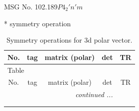 \documentclass[fleqn,8pt]{jsarticle}
\begin{document}
\setcounter{MaxMatrixCols}{32}

\renewcommand{\tablename}{Table~}
\renewcommand{\figurename}{Figure~}
\begin{center}
\LARGE
MSG No. 102.189\quad$P4_{2}'n'm$
\end{center}
* symmetry operation
\renewcommand{\arraystretch}{1.3}
\begin{longtable}{ccccc}
\caption{Symmetry operations for 3d polar vector.}
 \\
 \hline \hline
No. & tag & matrix (polar) & det & TR \\ \hline \endfirsthead

\multicolumn{4}{l}{\tablename\ \thetable{}} \\
 \hline \hline
No. & tag & matrix (polar) & det & TR \\ \hline \endhead

 \hline \hline
\multicolumn{4}{r}{\footnotesize\it continued ...} \\ \endfoot

 \hline \hline
\multicolumn{4}{r}{} \\ \endlastfoot


\end{longtable}
\end{document}
